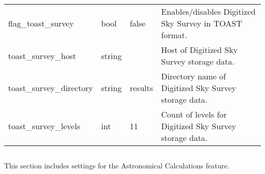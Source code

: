 \begin{longtable}{l|l|l|p{55mm}}
%
flag\_toast\_survey                & bool   & false & Enables/disables Digitized Sky Survey in TOAST format.\\%
toast\_survey\_host                & string &       & Host of Digitized Sky Survey storage data.\\%
toast\_survey\_directory           & string & results & Directory name of Digitized Sky Survey storage data.\\%
toast\_survey\_levels              & int    & 11    & Count of levels for Digitized Sky Survey storage data.\\\bottomrule
\end{longtable}

\subsection{}

This section includes settings for the Astronomical Calculations feature.

